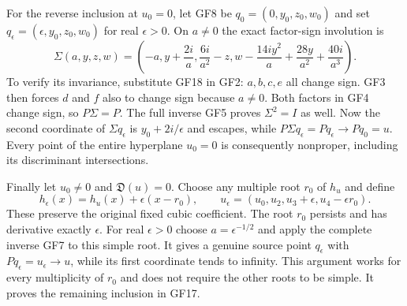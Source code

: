 \documentclass[11pt]{article}
\begin{document}
For the reverse inclusion at $u_0=0$, let GF8 be
$q_0=(0,y_0,z_0,w_0)$ and set
$q_\epsilon=(\epsilon,y_0,z_0,w_0)$ for real $\epsilon>0$.
On $a\ne0$ the exact factor-sign involution is
\begin{equation}
 \Sigma(a,y,z,w)=\left(-a,y+\frac{2i}{a},\frac{6i}{a^2}-z,
 w-\frac{14iy^2}{a}+\frac{28y}{a^2}+\frac{40i}{a^3}\right).
 \tag{GF18}
\end{equation}
To verify its invariance, substitute GF18 in GF2: $a,b,c,e$
all change sign. GF3 then forces $d$ and $f$ also to change sign
because $a\ne0$. Both factors in GF4 change sign, so
$P\Sigma=P$. The full inverse GF5 proves $\Sigma^2=I$ as well.
Now the second coordinate of $\Sigma q_\epsilon$ is
$y_0+2i/\epsilon$ and escapes, while
$P\Sigma q_\epsilon=Pq_\epsilon\to Pq_0=u$.
Every point of the entire hyperplane $u_0=0$ is consequently
nonproper, including its discriminant intersections.

Finally let $u_0\ne0$ and $\mathfrak D(u)=0$. Choose any multiple
root $r_0$ of $h_u$ and define
\[
 h_\epsilon(x)=h_u(x)+\epsilon(x-r_0),\qquad
 u_\epsilon=(u_0,u_2,u_3+\epsilon,u_4-\epsilon r_0).
\]
These preserve the original fixed cubic coefficient.
The root $r_0$ persists and has derivative exactly $\epsilon$.
For real $\epsilon>0$ choose $a=\epsilon^{-1/2}$ and apply the
complete inverse GF7 to this simple root. It gives a genuine
source point $q_\epsilon$ with $Pq_\epsilon=u_\epsilon\to u$,
while its first coordinate tends to infinity. This argument works
for every multiplicity of $r_0$ and does not require the other roots
to be simple. It proves the remaining inclusion in GF17.
\end{document}
